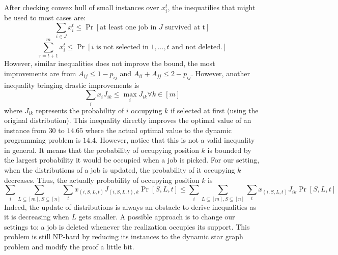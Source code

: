 \documentclass{article}
\begin{document}
After checking convex hull of small instances over $x_{i}^{t}$, the inequatilies that might be used to most cases are:
\[\sum_{i\in J}x_{i}^{t}\leq\Pr[\text{at least one job in $J$ survived at t}]\]
\[\sum_{\tau=t+1}^{m}x_i^t\leq \Pr[\text{$i$ is not selected in $1,\ldots,t$ and not deleted.}]\]
However, similar inequalities does not improve the bound, the most improvements are from $A_{ij}\leq 1-p_{ij}$ and $A_{ii}+A_{jj}\leq 2-p_{ij}$.
However, another inequality bringing drastic improvements is
\[\sum_{i}x_i J_{ik}\leq \max_i J_{ik}\forall k\in [m]\]
where $J_{ik}$ represents the probability of $i$ occupying $k$ if selected at first (using the original distribution).
This inequality directly improves the optimal value of an instance from $30$ to $14.65$ where the actual optimal value to the dynamic programming problem is $14.4$.
However, notice that this is not a valid inequality in general.
It means that the probability of occupying position $k$ is bounded by the largest probability it would be occupied when a job is picked.
For our setting, when the distributions of a job is updated, the probability of it occupying $k$ decreases.
Thus, the actually probability of occupying position $k$ is 
\[\sum_{i}\sum_{L\subseteq [m], S\subseteq [n]}\sum_t x_{(i,S,L,t)} J_{(i,S,L,t),k}\Pr[S,L,t]\leq \sum_{i}\sum_{L\subseteq [m], S\subseteq [n]}\sum_t x_{(i,S,L,t)} J_{ik}\Pr[S,L,t]\]
Indeed, the update of distributions is always an obstacle to derive inequalities as it is decreasing when $L$ gets smaller.
A possible approach is to change our settings to: a job is deleted whenever the realization occupies its support.
This problem is still NP-hard by reducing its instances to the dynamic star graph problem and modify the proof a little bit.
\end{document}
